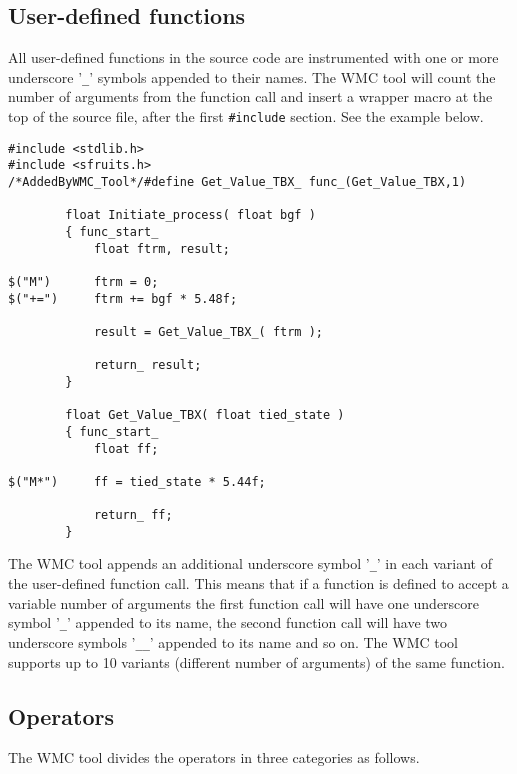 \subsection{User-defined functions}

All user-defined functions in the source code are instrumented with one or more underscore '\verb|_|' symbols appended to their names. The WMC tool will count the number of arguments from the function call and insert a wrapper macro at the top of the source file, after the first \verb|#include| section. See the example below.

\begin{Verbatim}[fontsize=\small]
#include <stdlib.h>
#include <sfruits.h>
/*AddedByWMC_Tool*/#define Get_Value_TBX_ func_(Get_Value_TBX,1)

        float Initiate_process( float bgf )
        { func_start_
            float ftrm, result;

$("M")      ftrm = 0;
$("+=")     ftrm += bgf * 5.48f;

            result = Get_Value_TBX_( ftrm );

            return_ result;
        }

        float Get_Value_TBX( float tied_state )
        { func_start_
            float ff;

$("M*")     ff = tied_state * 5.44f;

            return_ ff;
        }
\end{Verbatim}

The WMC tool appends an additional underscore symbol '\verb|_|' in each variant of the user-defined function call. This means that if a function is defined to accept a variable number of arguments the first function call will have one underscore symbol '\verb|_|' appended to its name, the second function call will have two underscore symbols '\verb|__|' appended to its name and so on. The WMC tool supports up to 10 variants (different number of arguments) of the same function.

\subsection{Operators}

The WMC tool divides the operators in three categories as follows.

